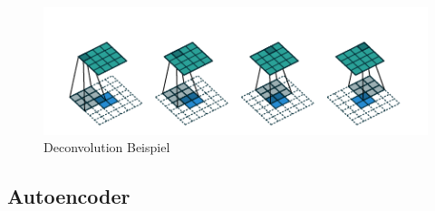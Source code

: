 \documentclass{llncs}
\begin{document}
\begin{figure}[htbp] 
	\centering
	\includegraphics[width=1.0\textwidth]{decon.png}
	\caption{Deconvolution Beispiel \protect\cite{conv}}
	\label{fig:Bild12}
\end{figure}
\newpage

\subsection{Autoencoder}\label{sec:autoencoder}
\end{document}
